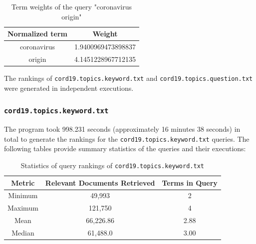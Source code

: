\documentclass[11pt]{article}
\begin{document}
\begin{table}[!ht]
    \caption{Term weights of the query "coronavirus origin"}
    \begin{center}

        \begin{tabular}{| c | c |}
        \hline
        \textbf{Normalized term} & \textbf{Weight}
        \\ \hline
        coronavirus & 1.9400969473898837
        \\ \hline
        origin & 4.1451228967712135
        \\ \hline
        \end{tabular}

    \end{center}

\end{table}

The rankings of \texttt{cord19.topics.keyword.txt} and \texttt{cord19.topics.question.txt} were generated in independent executions.

\subsubsection{\texttt{cord19.topics.keyword.txt}}
The program took 998.231 seconds (approximately 16 minutes 38 seconds) in total to generate the rankings for the \texttt{cord19.topics.keyword.txt} queries. The following tables provide summary statistics of the queries and their executions:


\begin{table}[!ht]
    \caption{Statistics of query rankings of \texttt{cord19.topics.keyword.txt}}
    \begin{center}

        \begin{tabular}{| c | c | c |}
        \hline
        \textbf{Metric} & \textbf{Relevant Documents Retrieved} & \textbf{Terms in Query}
        \\ \hline
        Minimum & 49,993 & 2
        \\ \hline
        Maximum & 121,750 & 4
        \\ \hline
        Mean & 66,226.86 & 2.88
        \\ \hline
        Median & 61,488.0 & 3.00
        \\ \hline
        \end{tabular}

    \end{center}

\end{table}
\end{document}
